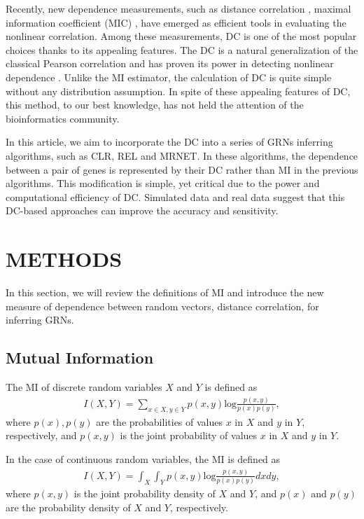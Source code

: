 \documentclass{bioinfo}
\begin{document}
Recently, new dependence measurements, such as distance correlation
\citep{szekely2007measuring}, maximal information coefficient (MIC)
\citep{reshef2011detecting}, have emerged as efficient tools in
evaluating the nonlinear correlation. Among these measurements, DC
is one of the most popular choices thanks to its appealing features.
The DC is a natural generalization of the classical Pearson
correlation and has proven its power in detecting nonlinear
dependence \citep{gorfine2012comment,szekely2007measuring}. Unlike
the MI estimator, the calculation of DC is quite simple without any
distribution assumption.  In spite of  these appealing features of
DC, this method, to our best knowledge, has not held the attention
of the bioinformatics community.

In this article, we aim to incorporate the DC into a series of GRNs inferring algorithms, such as CLR, REL and MRNET. In these algorithms, the dependence between a pair of genes is represented by their DC rather than MI in the previous algorithms. This modification is simple, yet critical due to the power and computational efficiency of DC. Simulated data and real data suggest that this DC-based approaches can improve the accuracy and sensitivity.

\section{METHODS}
In this section, we will review the definitions of MI and introduce
the new measure of dependence between random vectors, distance
correlation, for inferring GRNs.
\subsection{Mutual Information}
The MI of discrete random variables $X$ and $Y$ is defined as
\begin{align*}
    I(X,Y)=\sum_{x\in X,y\in Y} p(x,y)\mbox{log}\frac{p(x,y)}{p(x)p(y)},
\end{align*}
where $p(x),p(y)$ are the probabilities of values $x$ in $X$ and $y$
in $Y$, respectively, and $p(x,y)$ is the joint probability of
values $x$ in $X$ and $y$ in $Y$.

In the case of continuous random variables, the MI is defined as
\begin{align*}
    I(X,Y)=\int_X\int_Y p(x,y)\mbox{log}\frac{p(x,y)}{p(x)p(y)}dxdy,
\end{align*}
where $p(x,y)$ is the joint probability density of $X$ and $Y$, and $p(x)$ and $p(y)$ are the probability density of $X$ and $Y$, respectively.
\end{document}
